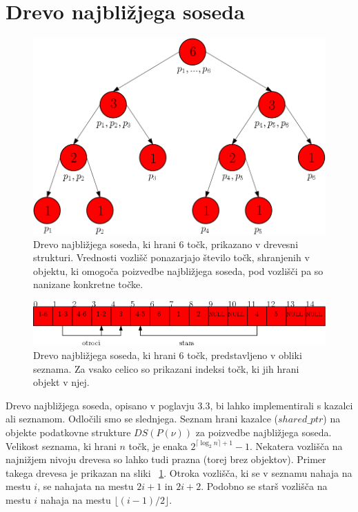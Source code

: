 \documentclass[a4paper, 12pt]{book}
\begin{document}
\section{Drevo najbližjega soseda}

\begin{figure}
\centerline{\includegraphics[scale=0.5]{pics/nntree-png.png}}
\caption{Drevo najbližjega soseda, ki hrani 6 točk, prikazano v drevesni strukturi. Vrednosti vozlišč ponazarjajo število točk, shranjenih v objektu, ki omogoča poizvedbe najbližjega soseda, pod vozlišči pa so nanizane konkretne točke.}
\label{nntree}
\end{figure}

\begin{figure}
\centerline{\includegraphics[scale=0.5]{pics/nnarray-png.png}}
\caption{Drevo najbližjega soseda, ki hrani 6 točk, predstavljeno v obliki seznama. Za vsako celico so prikazani indeksi točk, ki jih hrani objekt v njej.}
\label{nnarray}
\end{figure}

Drevo najbližjega soseda, opisano v poglavju 3.3, bi lahko implementirali s kazalci ali seznamom. Odločili smo se slednjega. Seznam hrani kazalce ($shared{\_}ptr$) na objekte podatkovne strukture $DS(P(\nu))$ za poizvedbe najbližjega soseda. Velikost seznama, ki hrani $n$ točk, je enaka $2^{\lceil \log_2n \rceil+1}-1$. Nekatera vozlišča na najnižjem nivoju drevesa so lahko tudi prazna (torej brez objektov). Primer takega drevesa je prikazan na sliki ~\ref{nntree}. Otroka vozlišča, ki se v seznamu nahaja na mestu $i$, se nahajata na mestu $2i+1$ in $2i+2$. Podobno se starš vozlišča na mestu $i$ nahaja na mestu $\lfloor(i-1)/2\rfloor$.
\end{document}
